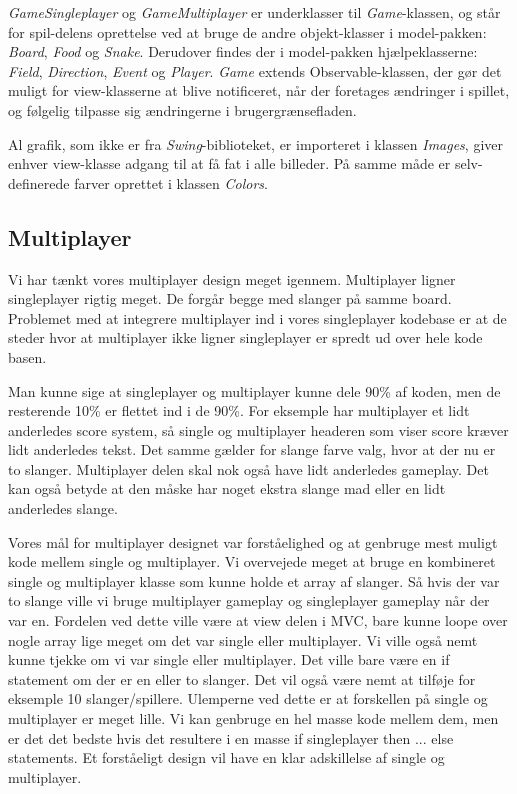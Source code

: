 \textit{GameSingleplayer} og \textit{GameMultiplayer} er underklasser til \textit{Game}-klassen, og står for spil-delens oprettelse ved at bruge de andre objekt-klasser i model-pakken: \textit{Board}, \textit{Food} og \textit{Snake}. Derudover findes der i model-pakken hjælpeklasserne: \textit{Field}, \textit{Direction}, \textit{Event} og \textit{Player}. \textit{Game} extends Observable-klassen, der gør det muligt for view-klasserne at blive notificeret, når der foretages ændringer i spillet, og følgelig tilpasse sig ændringerne i brugergrænsefladen.

Al grafik, som ikke er fra \textit{Swing}-biblioteket, er importeret i klassen \textit{Images}, giver enhver view-klasse adgang til at få fat i alle billeder. På samme måde er selv-definerede farver oprettet i klassen \textit{Colors}.


\subsection{Multiplayer}
Vi har tænkt vores multiplayer design meget igennem. Multiplayer ligner singleplayer rigtig meget. De forgår begge med slanger på samme board.  Problemet med at integrere multiplayer ind i vores singleplayer kodebase er at de steder hvor at multiplayer ikke ligner singleplayer er spredt ud over hele kode basen. 

Man kunne sige at singleplayer og multiplayer kunne dele 90\% af koden, men de resterende 10\% er flettet ind i de 90\%. For eksemple har multiplayer et lidt anderledes score system, så single og multiplayer headeren som viser score kræver lidt anderledes tekst. Det samme gælder for slange farve valg, hvor at der nu er to slanger. Multiplayer delen skal nok også have lidt anderledes gameplay. Det kan også betyde at den måske har noget ekstra slange mad eller en lidt anderledes slange. 

Vores mål for multiplayer designet var forståelighed og at genbruge mest muligt kode mellem single og multiplayer. Vi overvejede meget at bruge en kombineret single og multiplayer klasse som kunne holde et array af slanger. Så hvis der var to slange ville vi bruge multiplayer gameplay og singleplayer gameplay når der var en. Fordelen ved dette ville være at view delen i MVC, bare kunne loope over nogle array lige meget om det var single eller multiplayer. Vi ville også nemt kunne tjekke om vi var single eller multiplayer. Det ville bare være en if statement om der er en eller to slanger. Det vil også være nemt at tilføje for eksemple 10 slanger/spillere. Ulemperne ved dette er at forskellen på single og multiplayer er meget lille. Vi kan genbruge en hel masse kode mellem dem, men er det det bedste hvis det resultere i en masse if singleplayer then ... else statements.  Et forståeligt design vil have en klar adskillelse af single og multiplayer.


